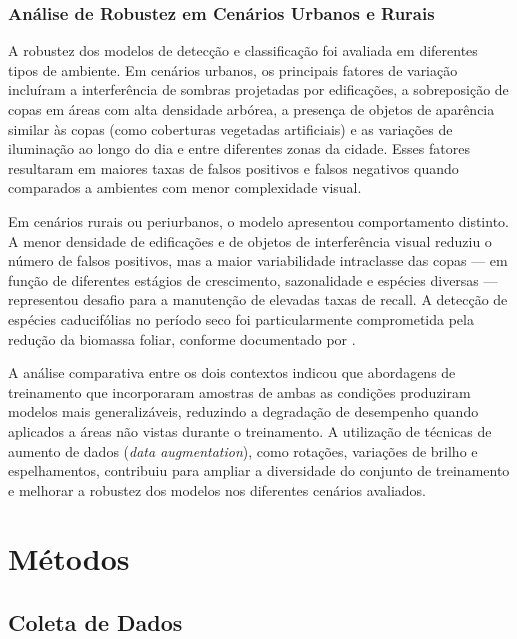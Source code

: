 \documentclass[
    12pt,
    openright,
    oneside,
    a4paper,
    sumario=tradicional,
    english,
    brazil,
    ]{abntex2}
\begin{document}
\subsection{Análise de Robustez em Cenários Urbanos e Rurais}

A robustez dos modelos de detecção e classificação foi avaliada em diferentes tipos de ambiente. Em cenários urbanos, os principais fatores de variação incluíram a interferência de sombras projetadas por edificações, a sobreposição de copas em áreas com alta densidade arbórea, a presença de objetos de aparência similar às copas (como coberturas vegetadas artificiais) e as variações de iluminação ao longo do dia e entre diferentes zonas da cidade. Esses fatores resultaram em maiores taxas de falsos positivos e falsos negativos quando comparados a ambientes com menor complexidade visual.

Em cenários rurais ou periurbanos, o modelo apresentou comportamento distinto. A menor densidade de edificações e de objetos de interferência visual reduziu o número de falsos positivos, mas a maior variabilidade intraclasse das copas --- em função de diferentes estágios de crescimento, sazonalidade e espécies diversas --- representou desafio para a manutenção de elevadas taxas de recall. A detecção de espécies caducifólias no período seco foi particularmente comprometida pela redução da biomassa foliar, conforme documentado por \textcite{dos2006detecccao}.

A análise comparativa entre os dois contextos indicou que abordagens de treinamento que incorporaram amostras de ambas as condições produziram modelos mais generalizáveis, reduzindo a degradação de desempenho quando aplicados a áreas não vistas durante o treinamento. A utilização de técnicas de aumento de dados (\textit{data augmentation}), como rotações, variações de brilho e espelhamentos, contribuiu para ampliar a diversidade do conjunto de treinamento e melhorar a robustez dos modelos nos diferentes cenários avaliados.



\chapter{Métodos}\label{sec:metodos}

\section{Coleta de Dados}
\end{document}
